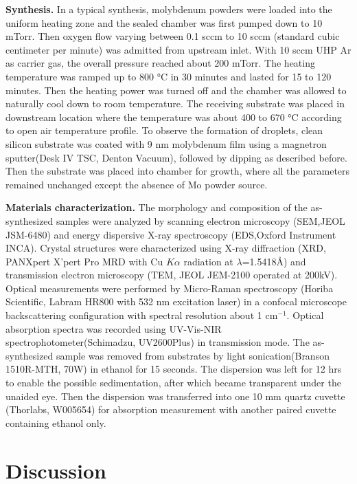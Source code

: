 \textbf{Synthesis.} In a typical synthesis, molybdenum powders were loaded into the uniform heating zone and the sealed chamber was first pumped down to 10 mTorr. Then oxygen flow varying between 0.1 sccm to 10 sccm (standard cubic centimeter per minute) was admitted from upstream inlet. With 10 sccm UHP Ar as carrier gas, the overall pressure reached about 200 mTorr. The heating temperature was ramped up to 800 \si{\degreeCelsius} in 30 minutes and lasted for 15 to 120 minutes. Then the heating power was turned off and the chamber was allowed to naturally cool down to room temperature. The receiving substrate was placed in downstream location where the temperature was about 400 to 670 \si{\degreeCelsius} according to open air temperature profile. To observe the formation of droplets, clean silicon substrate was coated with 9 nm molybdenum film using a magnetron sputter(Desk IV TSC, Denton Vacuum), followed by  dipping as described before. Then the substrate was placed into chamber for growth, where all the parameters remained unchanged except the absence of Mo powder source.

\textbf{Materials characterization.} The morphology and composition of the as-synthesized samples were analyzed by scanning electron microscopy (SEM,JEOL JSM-6480) and energy dispersive X-ray spectroscopy (EDS,Oxford Instrument INCA). Crystal structures were characterized using X-ray diffraction (XRD, PANXpert X’pert Pro MRD with Cu $K\alpha$ radiation at $\lambda$=1.5418\AA) and transmission electron microscopy (TEM, JEOL JEM-2100  operated at 200kV). Optical measurements were performed by Micro-Raman spectroscopy (Horiba Scientific, Labram HR800 with 532 nm excitation laser) in a confocal microscope backscattering configuration with spectral resolution about 1 cm$^{-1}$. Optical absorption spectra was recorded using UV-Vis-NIR spectrophotometer(Schimadzu, UV2600Plus) in transmission mode. The as-synthesized sample was removed from substrates by light sonication(Branson 1510R-MTH, 70W) in ethanol for 15 seconds. The dispersion was left for 12 hrs to enable the possible sedimentation, after which became transparent under the unaided eye. Then the dispersion was transferred into one 10 mm quartz cuvette (Thorlabs, W005654) for absorption measurement with another paired cuvette containing ethanol only.


\section{Discussion}


